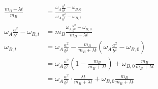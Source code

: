 \documentclass{esg8012pset}
\begin{document}
\begin{solution}
\begin{align*}
  \frac{m_B + \lambda t}{m_B} & = \frac{\omega_A\frac{a^2}{b^2} - \omega_{B,0}}{\omega_A\frac{a^2}{b^2} - \omega_{B,t}} \\
  \omega_A\frac{a^2}{b^2} - \omega_{B,t} & = m_B\frac{\omega_A\frac{a^2}{b^2} - \omega_{B,0}}{m_B + \lambda t} \\
  \omega_{B,t} & = \omega_A\frac{a^2}{b^2} - \frac{m_B}{m_B + \lambda t}\left(\omega_A\frac{a^2}{b^2} - \omega_{B,0}\right) \\
    & = \omega_A\frac{a^2}{b^2}\left(1 - \frac{m_B}{m_B + \lambda t}\right) + \omega_{B,0}\frac{m_B}{m_B + \lambda t} \\
    & = \omega_A\frac{a^2}{b^2}\cdot \frac{\lambda t}{m_B + \lambda t} + \omega_{B,0}\frac{m_B}{m_B + \lambda t}
  \end{align*}
\end{solution}
\end{document}
